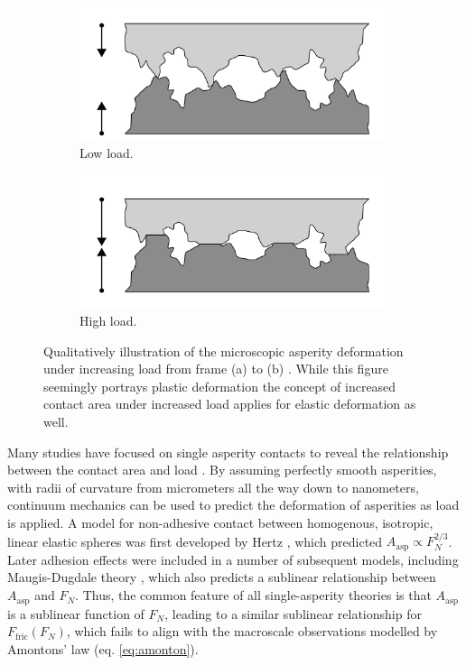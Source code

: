 \begin{figure}[H]
  \centering
  \begin{subfigure}[b]{0.49\textwidth}
      \centering
      \includegraphics[width=\textwidth]{figures/theory/asperities_top.png}
      \caption{Low load.}
      \label{fig:asp_left}
  \end{subfigure}
  \hfill
  \begin{subfigure}[b]{0.49\textwidth}
      \centering
      \includegraphics[width=\textwidth]{figures/theory/asperities_bottom.png}
      \caption{High load.}
      \label{fig:asp_right}
  \end{subfigure}
  \hfill
     \caption{Qualitatively illustration of the microscopic asperity deformation
     under increasing load from frame (a) to (b) \cite{wiki:asperities}. While this figure seemingly portrays plastic deformation the concept of increased contact area under increased load applies for elastic deformation as well.}
     \label{fig:asperity_contact}
\end{figure}

Many studies have focused on single asperity contacts to reveal the relationship
between the contact area and load
\cite{Szlufarska_2008,PhysRevLett.56.930,perry_scanning_2004}. By
assuming perfectly smooth asperities, with radii of curvature from micrometers
all the way down to nanometers, continuum mechanics can be used to predict the
deformation of asperities as load is applied. A model for non-adhesive contact
between homogenous, isotropic, linear elastic spheres was first developed by
Hertz \cite{HertzOnTC}, which predicted $A_{\text{asp}} \propto F_N^{2/3}$.
Later adhesion effects were included in a number of subsequent models, including
Maugis-Dugdale theory \cite{MAUGIS1992243}, which also predicts a sublinear
relationship between $A_{\text{asp}}$ and $F_N$. Thus, the common feature of all
single-asperity theories is that $A_{\text{asp}}$ is a sublinear function of
$F_N$, leading to a similar sublinear relationship for $F_\text{fric}(F_N)$,
which fails to align with the macroscale observations modelled by Amontons’ law
(eq. \eqref{eq:amonton}).


